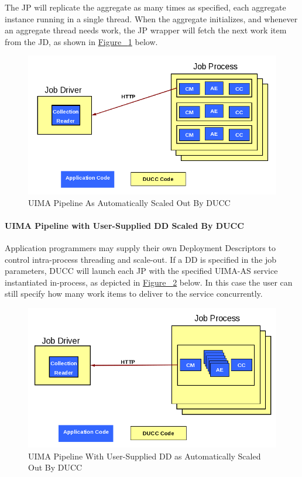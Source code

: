 	The JP will replicate the aggregate as many times as specified, each aggregate instance running 
	in a single thread. When the aggregate initializes, and whenever an aggregate thread needs work,
	the JP wrapper will fetch the next work item from the JD, as shown in 
    \hyperref[fig:UIMA-AS-pipeline-DUCC]{Figure ~\ref{fig:UIMA-AS-pipeline-DUCC}} below.

    \begin{figure}[H]
      \centering
      \includegraphics[width=5.5in]{images/ducc-sequential.png}
      \caption{UIMA Pipeline As Automatically Scaled Out By DUCC}
      \label{fig:UIMA-AS-pipeline-DUCC}
    \end{figure}

    \paragraph{UIMA Pipeline with User-Supplied DD Scaled By DUCC}

    Application programmers may supply their own Deployment Descriptors to control intra-process
    threading and scale-out.  If a DD is specified in the job parameters, DUCC will launch each
    JP with the specified UIMA-AS service instantiated in-process,
    as depicted in \hyperref[fig:UIMA-AS-pipeline-DUCC-DD]{Figure ~\ref{fig:UIMA-AS-pipeline-DUCC-DD}} below.
    In this case the user can still specify how many work items to deliver to the service concurrently.

    \begin{figure}[H]
      \centering
      \includegraphics[width=5.5in]{images/ducc-parallel.png}
      \caption{UIMA Pipeline With User-Supplied DD as Automatically Scaled Out By DUCC}
      \label{fig:UIMA-AS-pipeline-DUCC-DD}
    \end{figure}

